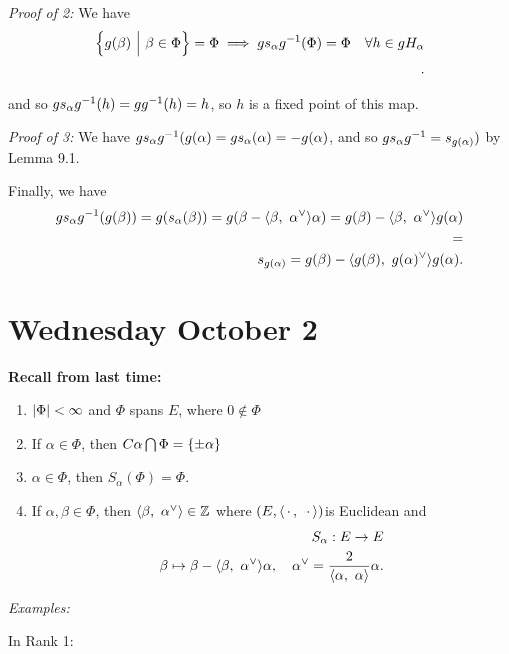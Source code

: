 \emph{Proof of 2:} We have \begin{align*}
\left\{{g(\beta) {~\mathrel{\Big|}~} \beta \in \Phi}\right\} = \Phi \implies g s_\alpha g^{-1} (\Phi) = \Phi \quad \forall h\in gH_\alpha \\
.\end{align*}

and so \(gs_\alpha g^{-1}(h) = gg^{-1}(h) = h\), so \(h\) is a fixed point
of this map.

\emph{Proof of 3:} We have
\(gs_\alpha g^{-1}(g(\alpha) = gs_\alpha(\alpha) = -g(\alpha)\), and so
\(gs_\alpha g^{-1} = s_{g(\alpha)})\) by Lemma 9.1.

Finally, we have \begin{align*}
g s_\alpha g^{-1} (g(\beta)) = g(s_\alpha(\beta)) = g(\beta - {\left\langle {\beta},~{\alpha^\vee} \right\rangle}\alpha) = g(\beta) - {\left\langle {\beta},~{\alpha^\vee} \right\rangle}g(\alpha) \\
= \\
s_{g(\alpha)} = g(\beta) - {\left\langle {g(\beta)},~{g(\alpha)^\vee} \right\rangle}g(\alpha)
.\end{align*}

\hypertarget{wednesday-october-2}{%
\section{Wednesday October 2}\label{wednesday-october-2}}

\textbf{Recall from last time:}

\begin{enumerate}
\def\labelenumi{\arabic{enumi}.}
\tightlist
\item
  \({\left\lvert {\Phi} \right\rvert} < \infty\) and \(\Phi\) spans \(E\), where
  \(0\not\in \Phi\)
\item
  If \(\alpha \in \Phi\), then
  \(C\alpha \bigcap \Phi = \left\{{\pm \alpha}\right\}\)
\item
  \(\alpha \in \Phi\), then \(S_\alpha(\Phi) = \Phi\).
\item
  If \(\alpha, \beta \in \Phi\), then
  \({\left\langle {\beta},~{\alpha^\vee} \right\rangle} \in {\mathbb{Z}}\) where
  \((E, {\left\langle {{\,\cdot\,}},~{{\,\cdot\,}} \right\rangle})\)is Euclidean and \begin{align*}
  S_\alpha: E \to E \\
  \beta \mapsto \beta - {\left\langle {\beta},~{\alpha^\vee} \right\rangle}\alpha, \quad \alpha^\vee = \frac {2} {{\left\langle {\alpha},~{\alpha} \right\rangle}} \alpha
  .\end{align*}
\end{enumerate}

\emph{Examples:}

In Rank 1:


